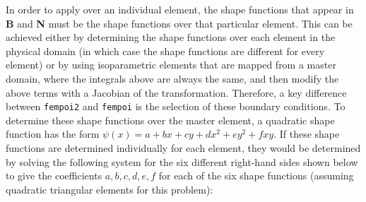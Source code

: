 \documentclass[10pt]{article}
\begin{document}
In order to apply over an individual element, the shape functions that appear in \textbf{B} and \textbf{N} must be the shape functions over that particular element. This can be achieved either by determining the shape functions over each element in the physical domain (in which case the shape functions are different for every element) or by using isoparametric elements that are mapped from a master domain, where the integrals above are always the same, and then modify the above terms with a Jacobian of the transformation. Therefore, a key difference between {\tt fempoi2} and {\tt fempoi} is the selection of these boundary conditions. To determine these shape functions over the master element, a quadratic shape function has the form \(\psi(x)=a+bx+cy+dx^2+ey^2+fxy\). If these shape functions are determined individually for each element, they would be determined by solving the following system for the six different right-hand sides shown below to give the coefficients \(a, b, c, d, e, f\) for each of the six shape functions (assuming quadratic triangular elements for this problem):
\end{document}

